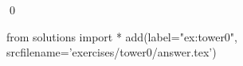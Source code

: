 
\begin{ex} 
  \label{ex:tower0}
  
  \qed
\end{ex} 
\begin{python0}
from solutions import *
add(label="ex:tower0",
    srcfilename='exercises/tower0/answer.tex') 
\end{python0}

